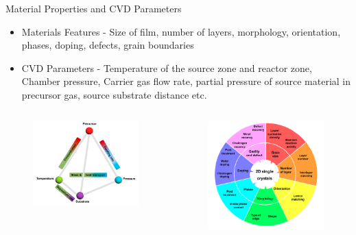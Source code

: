 \documentclass{beamer}
\begin{document}
\begin{frame}{Material Properties and CVD Parameters}
    \begin{itemize}
        \item Materials Features - Size of film, number of layers, morphology, orientation, phases, doping, defects, grain boundaries
        \item CVD Parameters - Temperature of the source zone and reactor zone, Chamber pressure, Carrier gas flow rate, partial pressure of source material in precursor gas, source substrate distance etc.
    \end{itemize}
    \begin{columns}
    \begin{figure}
        \includegraphics[scale = 0.5]{parameters_CVD.PNG}
    \end{figure}
    \begin{figure}
        \includegraphics[scale = 0.5]{2D_material_features.PNG}
    \end{figure}
    \end{columns}
\end{frame}
\end{document}
